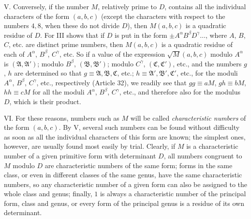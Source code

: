 V. Conversely, if the number $M$, relatively prime to $D$, contains all the individual characters of the form $(a,b,c)$ (except the characters with respect to the numbers $4,8$, when these do not divide $D$), then $M(a,b,c)$ is a quadratic residue of $D$. For III shows that if $D$ is put in the form $\pm A^\alpha B^\beta D^\gamma\ldots$, where $A$, $B$, $C$, etc. are distinct prime numbers, then $M(a,b,c)$ is a quadratic residue of each of $A^\alpha$, $B^\beta$, $C^\gamma$, etc. So if a value of the expression $\surd M(a,b,c)$ modulo $A^\alpha$ is $(\mathfrak{A},\mathfrak{A}')$; modulo $B^\beta$, $(\mathfrak{B},\mathfrak{B}')$; modulo $C^\gamma$, $(\mathfrak{C},\mathfrak{C}')$, etc., and the numbers $g$, $h$ are determined so that $g\equiv\mathfrak{A},\mathfrak{B},\mathfrak{C}$, etc.; $h\equiv\mathfrak{A}',\mathfrak{B}',\mathfrak{C}'$, etc., for the moduli $A^\alpha$, $B^\beta$, $C^\gamma$, etc., respectively (Article 32), we readily see that $gg\equiv aM$, $gh\equiv bM$, $hh\equiv cM$ for all the moduli $A^\alpha$, $B^\beta$, $C^\gamma$, etc., and therefore also for the modulus $D$, which is their product.

VI. For these reasons, numbers such as $M$ will be called \textit{characteristic numbers} of the form $(a,b,c)$. By V, several such numbers can be found without difficulty as soon as all the individual characters of this form are known; the simplest ones, however, are usually found most easily by trial. Clearly, if $M$ is a characteristic number of a given primitive form with determinant $D$, all numbers congruent to $M$ modulo $D$ are characteristic numbers of the same form; forms in the same class, or even in different classes of the same genus, have the same characteristic numbers, so any characteristic
number of a given form can also be assigned to the whole class and genus; finally, $1$ is always a characteristic number of the principal form, class and genus, or every form of the principal genus is a residue of its own determinant.

